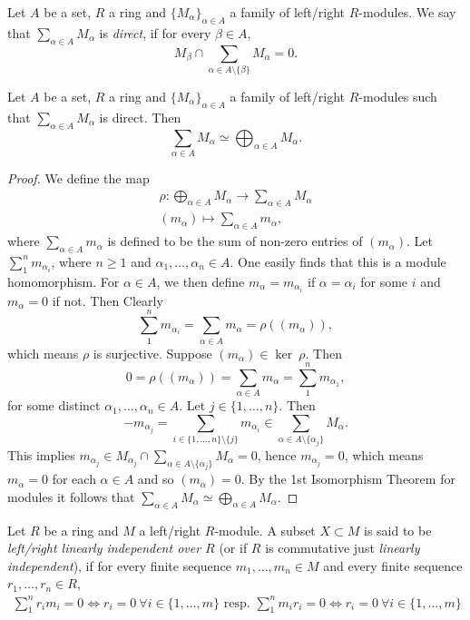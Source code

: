 \begin{definition}
    Let $A$ be a set, $R$ a ring and $\{M_\alpha\}_{\alpha\in A}$ a family of left/right $R$-modules. We say that $\sum_{\alpha\in A} M_\alpha$ is \textit{direct}, if 
    for every $\beta \in A$,
    $$M_\beta \cap \sum_{\alpha\in A \setminus\{\beta\}} M_\alpha = 0.$$
\end{definition}
\begin{lemma}
    Let $A$ be a set, $R$ a ring and $\{M_\alpha\}_{\alpha\in A}$ a family of left/right $R$-modules such that $\sum_{\alpha\in A} M_\alpha$ is direct. Then 
    $$\sum_{\alpha\in A} M_\alpha \simeq \bigoplus_{\alpha \in A} M_\alpha.$$
\end{lemma}
\begin{proof}
    We define the map 
    \begin{gather*}
        \rho : \bigoplus_{\alpha \in A} M_\alpha \rightarrow \sum_{\alpha\in A} M_\alpha\\
        (m_\alpha) \mapsto \sum_{\alpha \in A} m_\alpha,
    \end{gather*}
    where $\sum_{\alpha\in A} m_\alpha$ is defined to be the sum of non-zero entries of $(m_\alpha)$. Let $\sum_1^n m_{\alpha_i}$, where $n\geq 1$ and $\alpha_1,\dots,\alpha_n\in A$. One easily finds that this is a module homomorphism. For $\alpha \in A$, we then define $m_\alpha = m_{\alpha_i}$ if $\alpha = \alpha_i$ for some $i$ and $m_\alpha = 0$ if not. Then Clearly 
    $$\sum_1^n m_{\alpha_i}=\sum_{\alpha\in A} m_\alpha =\rho((m_\alpha)),$$
    which means $\rho$ is surjective. Suppose $(m_\alpha)\in \ker \ \rho$. Then 
    $$0=\rho((m_\alpha))= \sum_{\alpha \in A} m_\alpha = \sum_1^n m_{\alpha_1},$$
    for some distinct $\alpha_1,\dots,\alpha_n\in A$. Let $j\in \{1,\dots, n\}$. Then
    $$-m_{\alpha_j} = \sum_{i\in\{1,\dots,n\}\setminus \{j\}} m_{\alpha_i} \in \sum_{\alpha \in A\setminus\{\alpha_j\}} M_\alpha. $$
    This implies $m_{\alpha_j}\in M_{\alpha_j}\cap \sum_{\alpha \in A\setminus\{\alpha_j\}} M_\alpha =0$, hence $m_{\alpha_j} = 0$, which means $m_\alpha = 0$ for each $\alpha\in A$ and so $(m_\alpha)=0$. By the 1st Isomorphism Theorem for modules it follows that $\sum_{\alpha\in A} M_\alpha \simeq \bigoplus_{\alpha \in A} M_\alpha$.  
\end{proof}
\begin{definition}
    Let $R$ be a ring and $M$ a left/right $R$-module. A subset $X\subset M$ is said to be \textit{left/right linearly independent over $R$} (or if $R$ is commutative just \textit{linearly independent}), if for every finite sequence $m_1,\dots,m_n\in M$ and every finite sequence $r_1,\dots,r_n\in R$, 
    \begin{gather*}
        \sum_1^n r_im_i = 0 \iff r_i = 0\ \forall i\in \{1,\dots,m\} \text{ resp. } \sum_1^n m_ir_i =0 \iff r_i = 0\  \forall i\in \{1,\dots,m\}
    \end{gather*}
\end{definition}
